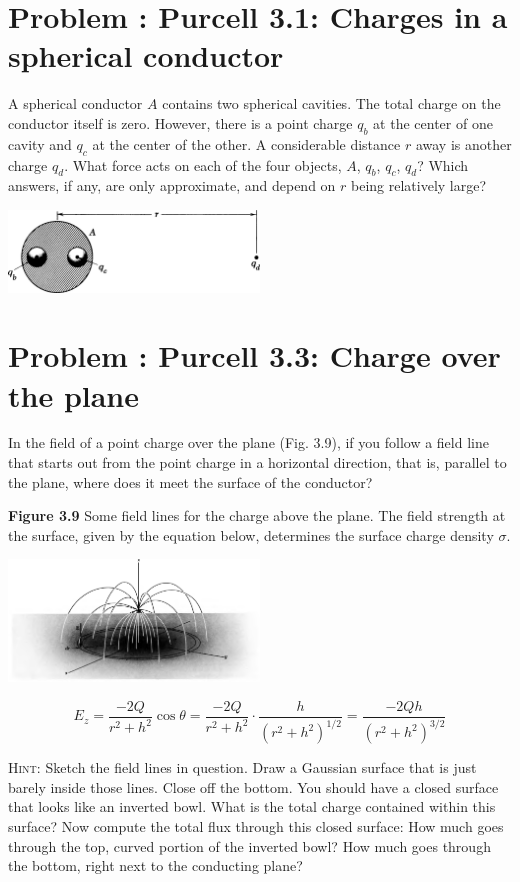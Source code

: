 \documentclass[problems]{esg8022pset}
\date{\today }
\begin{document}
\section{Problem \thesection: Purcell 3.1: Charges in a spherical conductor}
  A spherical conductor $A$ contains two spherical cavities. The
  total charge on the conductor itself is zero. However, there is a
  point charge $q_b$ at the center of one cavity and $q_c$ at the
  center of the other.  A considerable distance $r$ away is another
  charge $q_d$. What force acts on each of the four objects, $A$,
  $q_b$, $q_c$, $q_d$? Which answers, if any, are only approximate,
  and depend on $r$ being relatively large?
  \begin{center}\includegraphics[width=0.5\textwidth]{ps04_01}\end{center}
\section{Problem \thesection: Purcell 3.3: Charge over the plane}
  In the field of a point charge over the plane (Fig. 3.9), if you
  follow a field line that starts out from the point charge in a
  horizontal direction, that is, parallel to the plane, where does
  it meet the surface of the conductor?

  \textbf{Figure 3.9} Some field lines for the charge above the plane.
  The field strength at the surface, given by the equation below,
  determines the surface charge density $\sigma$.
  \begin{center}\includegraphics[width=0.5\textwidth]{ps04_02}\end{center}
  \begin{equation*}
    E_z = \frac{-2Q}{r^2 + h^2} \cos\theta = \frac{-2Q}{r^2 + h^2}\cdot \frac{h}{(r^2 + h^2)^{1/2}} = \frac{-2Qh}{(r^2 + h^2)^{3/2}}
  \end{equation*}

  \noindent \textsc{Hint}: Sketch the field lines in question.  Draw
  a Gaussian surface that is just barely inside those lines.  Close
  off the bottom.  You should have a closed surface that looks like
  an inverted bowl.  What is the total charge contained within this
  surface?  Now compute the total flux through this closed surface:
  How much goes through the top, curved portion of the inverted bowl?
  How much goes through the bottom, right next to the conducting plane?
\end{document}
